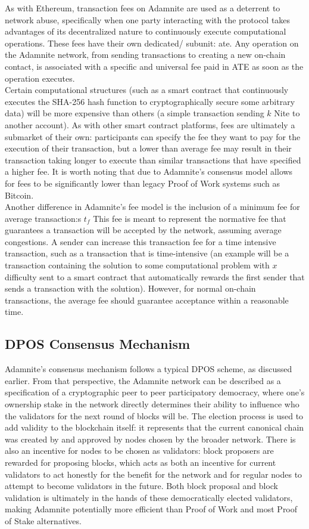 \documentclass[conference]{IEEEtran}
\begin{document}
As with Ethereum, transaction fees on Adamnite are used as a deterrent to network abuse, specifically when one party interacting with the protocol takes advantages of its decentralized nature to continuously execute computational operations. These fees have their own dedicated/ subunit: ate. Any operation on the Adamnite network, from sending transactions to creating a new on-chain contact, is associated with a specific and universal fee paid in ATE as soon as the operation executes.\\
Certain computational structures (such as a smart contract that continuously executes the SHA-256 hash function to cryptographically secure some arbitrary data) will be more expensive than others (a simple transaction sending $k$ Nite to another account). As with other smart contract platforms, fees are ultimately a submarket of their own: participants can specify the fee they want to pay for the execution of their transaction, but a lower than average fee may result in their transaction taking longer to execute than similar transactions that have specified a higher fee. It is worth noting that due to Adamnite's consensus model allows for fees to be significantly lower than legacy Proof of Work systems such as Bitcoin.\\
Another difference in Adamnite's fee model is the inclusion of a minimum fee for average transaction:s $t_f$ This fee is meant to represent the normative fee that guarantees a transaction will be accepted by the network, assuming average congestions. A sender can increase this transaction fee for a time intensive transaction, such as a transaction  that is time-intensive (an example will be a transaction containing the solution to some computational problem with $x$ difficulty sent to a smart contract that automatically rewards the first sender that sends a transaction with the solution). However, for normal on-chain transactions, the average fee should guarantee acceptance within a reasonable time.

\subsection{DPOS Consensus Mechanism}
Adamnite's consensus mechanism follows a typical DPOS scheme, as discussed earlier. From that perspective, the Adamnite network can be described as a specification of a cryptographic peer to peer participatory democracy, where one's ownership stake in the network directly determines their ability to influence who the validators for the next round of blocks will be. The election process is used to add validity to the blockchain itself: it represents that the current canonical chain was created by and approved by nodes chosen by the broader network. There is also an incentive for nodes to be chosen as validators: block proposers are rewarded for proposing blocks, which acts as both an incentive for current validators to act honestly for the benefit for the network and for regular nodes to attempt to become validators in the future. Both block proposal and block validation is ultimately in the hands of these democratically elected validators, making Adamnite potentially more efficient than Proof of Work and most Proof of Stake alternatives.\\
\end{document}
